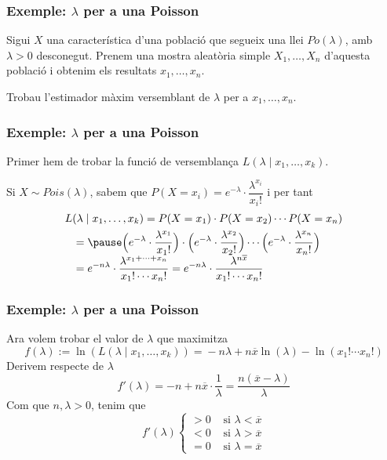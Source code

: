 \documentclass[12pt,t]{beamer}
\theoremstyle{plain}
\theoremstyle{definition}
\begin{document}
\begin{frame}
\frametitle{Exemple: $\lambda$ per a una Poisson}

\vspace{1cm}

\begin{block}{}
Sigui $X$ una característica d'una població que segueix una llei $Po(\lambda)$, amb $\lambda>0$ desconegut. Prenem una mostra aleatòria simple $X_1,\ldots,X_n$ d'aquesta població i obtenim els resultats $x_1,\ldots,x_n$. 
\medskip

Trobau l'estimador màxim versemblant de $\lambda$ per a $x_1,\ldots,x_n$.
\end{block}
\end{frame}

\begin{frame}
\frametitle{Exemple: $\lambda$ per a una Poisson}

Primer hem de trobar 
la funció de versemblança $L(\lambda\mid x_1,\ldots,x_k)$.
\medskip

Si $X\sim Pois(\lambda)$, sabem que $P(X=x_i)=e^{-\lambda}\cdot \dfrac{\lambda^{x_i}}{x_i!}$ i per tant
$$
\begin{array}{l}
L(\lambda\mid x_1,\ldots,x_k)  =\displaystyle P(X=x_1)\cdot P(X=x_2)\cdots P(X=x_n)\\[1ex] \quad =\pause\displaystyle 
\Big(e^{-\lambda}\cdot \frac{\lambda^{x_1}}{x_1!}\Big)\cdot \Big(e^{-\lambda}\cdot \frac{\lambda^{x_2}}{x_2!}\Big)\cdots \Big(e^{-\lambda}\cdot \frac{\lambda^{x_n}}{x_n!}\Big)\\[1ex] \quad =\displaystyle e^{-n\lambda}\cdot \frac{\lambda^{x_1+\cdots+x_n}}{x_1!\cdots x_n!}=e^{-n\lambda}\cdot \frac{\lambda^{n\overline{x}}}{x_1!\cdots x_n!}

\end{array}
$$
\end{frame}

\begin{frame}
\frametitle{Exemple: $\lambda$ per a una Poisson}

Ara volem trobar el valor de $\lambda$ que maximitza 
$$
f(\lambda)\!:=\!\ln(L(\lambda\mid x_1,\ldots,x_k))\!=\!-n\lambda+n\overline{x}\ln(\lambda)-\ln(x_1!\cdots x_n!)
$$
\pause
Derivem respecte de $\lambda$
$$
f'(\lambda)=-n+n\overline{x}\cdot \frac{1}{\lambda}=
\frac{n(\overline{x}-\lambda)}{\lambda}
$$
Com que $n,\lambda>0$, tenim que 
$$
f'(\lambda)\left\{\begin{array}{ll}
>0 &\mbox{ si $\lambda<\overline{x}$}\\[1ex]
<0 &\mbox{ si $\lambda>\overline{x}$}\\[1ex]
=0 &\mbox{ si $\lambda=\overline{x}$}
\end{array}\right.
$$
\end{frame}
\end{document}
